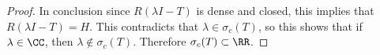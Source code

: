 \documentclass[11pt, oneside]{article}
\begin{document}
\begin{enumerate}
\begin{proof}
      In conclusion since $R(\lambda I - T)$ is dense and closed, this implies
      that $R(\lambda I - T) = H$.
      This contradicts that $\lambda \in \sigma_c(T)$, so this shows that if
      $\lambda \in \CC$, then $\lambda \not\in \sigma_c(T)$.
      Therefore $\sigma_c(T) \subset \RR$.
    \end{proof}
\end{enumerate}
\end{document}
